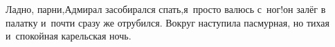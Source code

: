 \diagdash Ладно, парни,\mdash Адмирал засобирался спать,\mdash я~просто валюсь с~ног!\mdash он залёг в палатку и~почти сразу же отрубился. Вокруг наступила пасмурная, но тихая и~спокойная карельская ночь.


\vspace{-0.2cm}
\begin{center}
\end{center}
